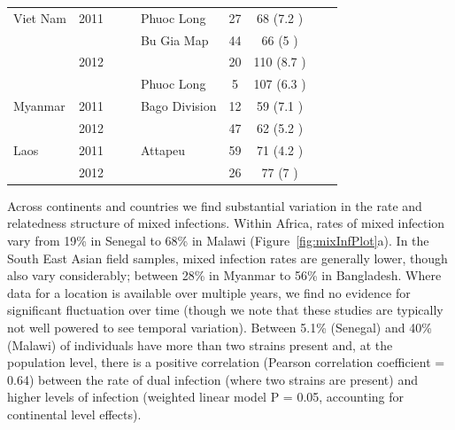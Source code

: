 \documentclass[9pt,lineno]{elife}
\begin{document}
\begin{table}[bt]
\begin{tabular}{l c c c |l c c c c }
\hline
Viet Nam        &2011           &&&Phuoc Long&27   &68   (7.2 )     &     &\\
                &               &&&Bu Gia Map&44   &66   (5   )     &     &\\
                &2012           &&&               &20   &110  (8.7 )     &     &\\
                &               &&&Phuoc Long&5    &107  (6.3 )     &     &\\
\hline
Myanmar         &2011           &&&Bago Division&12   &59   (7.1 )     &     &\\
                &2012           &&&               &47   &62   (5.2 )     &     &\\
\hline
Laos            &2011           &&&Attapeu&59   &71   (4.2 )     &     &\\
                &2012           &&&               &26   &77   (7   )     &     &\\
\bottomrule
\end{tabular}

\end{table}

Across continents and countries we find substantial variation in the rate and relatedness structure of mixed infections.  Within Africa, rates of mixed infection vary from 19\% in Senegal to 68\% in Malawi (Figure~\ref{fig:mixInfPlot}a).  In the South East Asian field samples, mixed infection rates are generally lower, though also vary considerably; between 28\% in Myanmar to 56\% in Bangladesh.  Where data for a location is available over multiple years, we find no evidence for significant fluctuation over time (though we note that these studies are typically not well powered to see temporal variation).  Between 5.1\% (Senegal) and 40\% (Malawi) of individuals have more than two strains present and, at the population level, there is a positive correlation (Pearson correlation coefficient = 0.64) between the rate of dual infection (where two strains are present) and higher levels of infection (weighted linear model P = 0.05, accounting for continental level effects).
\end{document}
